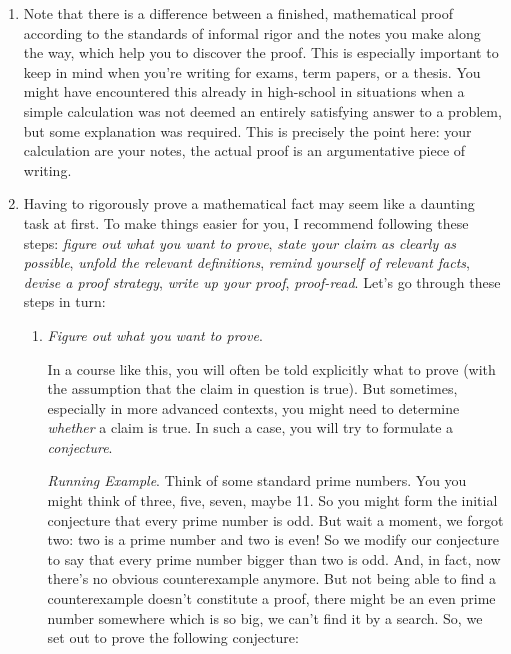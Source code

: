 \begin{enumerate}[{\thesection}.1]
	 \item Note that there is a difference between a finished, mathematical proof according to the standards of informal rigor and the notes you make along the way, which help you to discover the proof. This is especially important to keep in mind when you're writing for exams, term papers, or a thesis. You might have encountered this already in high-school in situations when a simple calculation was not deemed an entirely satisfying answer to a problem, but some explanation was required. This is precisely the point here: your calculation are your notes, the actual proof is an argumentative piece of writing. 
	 
	 \item Having to rigorously prove a mathematical fact may seem like a daunting task at first. To make things easier for you, I recommend following these steps:  \emph{figure out what you want to prove}, \emph{state your claim as clearly as possible}, \emph{unfold the relevant definitions}, \emph{remind yourself of relevant facts}, \emph{devise a proof strategy}, \emph{write up your proof}, \emph{proof-read}. Let's go through these steps in turn:

	 
	 	\begin{enumerate}[\thesection.{7}.1]
		
			\item \emph{Figure out what you want to prove}.
							
				In a course like this, you will often be told explicitly what to prove (with the assumption that the claim in question is true). But sometimes, especially in more advanced contexts, you might need to determine \emph{whether} a claim is true. In such a case, you will try to formulate a \emph{conjecture}.
				
				\vspace{2ex}
				
				\emph{Running Example}. Think of some standard prime numbers. You you might think of three, five, seven, maybe 11. So you might form the initial conjecture that every prime number is odd. But wait a moment, we forgot two: two is a prime number and two is even! So we modify our conjecture to say that every prime number bigger than two is odd. And, in fact, now there's no obvious counterexample anymore. But not being able to find a counterexample doesn't constitute a proof, there might be an even prime number somewhere which is so big, we can't find it by a search. So, we set out to prove the following conjecture:
				

\end{enumerate}
\end{enumerate}
